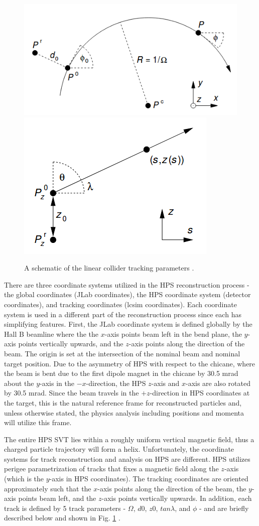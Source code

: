 \begin{figure}[t]
    \centering
    \includegraphics[width=.5\textwidth]{figs/recon/lcsim_1.png}
    \includegraphics[width=.4\textwidth]{figs/recon/lcsim_2.png}
    \caption{A schematic of the linear collider tracking parameters \cite{Kraemer:81214}. %
    }
    \label{fig:track_params}
\end{figure}

There are three coordinate systems utilized in the HPS reconstruction process - the global coordinates (JLab coordinates), the HPS coordinate system (detector coordinates), and tracking coordinates (lcsim coordinates). Each coordinate system is used in a different part of the reconstruction process since each has simplifying features. First, the JLab coordinate system is defined globally by the Hall B beamline where the the $x$-axis points beam left in the bend plane, the $y$-axis points vertically upwards, and the $z$-axis points along the direction of the beam. The origin is set at the intersection of the nominal beam and nominal target position. Due to the asymmetry of HPS with respect to the chicane, where the beam is bent due to the first dipole magnet in the chicane by 30.5 mrad about the $y$-axis in the $-x$-direction, the HPS $z$-axis and $x$-axis are also rotated by 30.5 mrad. Since the beam travels in the $+z$-direction in HPS coordinates at the target, this is the natural reference frame for reconstructed particles and, unless otherwise stated, the physics analysis including positions and momenta will utilize this frame.

The entire HPS SVT lies within a roughly uniform vertical magnetic field, thus a charged particle trajectory will form a helix. Unfortunately, the coordinate systems for track reconstruction and analysis on HPS are different. HPS utilizes perigee parametrization of tracks that fixes a magnetic field along the $z$-axis (which is the $y$-axis in HPS coordinates). The tracking coordinates are oriented approximately such that the $x$-axis points along the direction of the beam, the $y$-axis points beam left, and the $z$-axis points vertically upwards. In addition, each track is defined by 5 track parameters - $\Omega$, $d0$, $z0$, $tan \lambda$, and $\phi$ - and are briefly described below and shown in Fig. \ref{fig:track_params} \cite{Kraemer:81214}.

